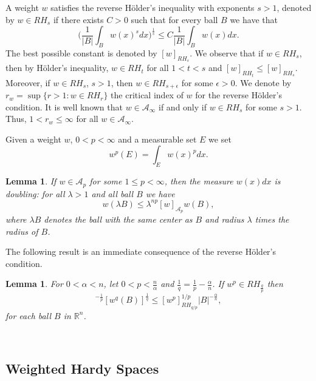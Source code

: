 \documentclass[a4paper,12pt,reqno]{amsart}
\numberwithin{equation}{section}
\newtheorem{lemma}[theorem]{Lemma}
\begin{document}
	A weight $w$ satisfies the reverse H\"{o}lder's inequality with exponents $s>1$, denoted by $w \in RH_s$ if there exists $C>0$ such that for every ball $B$ we have that 
	\begin{equation}\label{cond s}
		\Big( \frac{1}{|B|} \int_B w(x)^{s} dx \Big)^{\frac{1}{s}} \leq C\frac{1}{|B|} \int_B w(x)dx.
	\end{equation}
	The best possible constant is denoted by $[w]_{RH_s}$. We observe that if $w \in RH_s$, then by H\"{o}lder's inequality, $w \in RH_t$ for all $1 < t < s$ and $[w]_{RH_t} \leq [w]_{RH_s}$.
	Moreover, if $w \in RH_s$, $s>1$, then $w \in RH_{s+\epsilon}$ for some $\epsilon >0$. We denote by $r_w=\sup\{r>1 : w \in RH_r\}$ the critical index of $w$ for the reverse H\"{o}lder's condition.
	It is well known that $w \in \mathcal{A}_{\infty}$ if and only if $w \in RH_s$ for some $s>1$. Thus, $1<r_w \leq \infty$ for all $w \in \mathcal{A}_{\infty}$.\newline
	
	Given a weight $w$, $0<p<\infty$ and a measurable set $E$ we set 
	$$w^p(E)=\int_E w(x)^p dx.$$ 
	
	\begin{lemma}
		If $w \in \mathcal{A}_p$ for some $1\leq p< \infty$, then the measure $w(x)dx$ is doubling: for all $\lambda >1$ and all ball $B$ we have
		\begin{equation*}
			w(\lambda B) \leq \lambda^{np} [w]_{\mathcal{A}_p} w(B),
		\end{equation*}
		where $\lambda B$ denotes the ball with the same center as $B$ and radius $\lambda$ times the radius of $B$.
	\end{lemma}
	The following result is an immediate consequence of the reverse H\"{o}lder's condition.
	
	\begin{lemma}\label{weightRH}
		For $0<\alpha<n$, let $0<p<\frac{n}{\alpha}$ and $\frac{1}{q}=\frac{1}{p}-\frac{\alpha}{n}$. If $w^p  \in RH_{\frac{q}{p}}$ then
		\begin{equation}
			[w^p(B)]^{-\frac{1}{p}} [w^q(B)]^{\frac{1}{q}}\leq [w^p]^{1/p}_{RH_{q/p}} |B|^{-\frac{\alpha}{n}},
		\end{equation}
		for each ball $B$ in $\mathbb{R}^n$.
	\end{lemma}
	
	\
	
	
	
	\subsection{Weighted Hardy Spaces}
	
\end{document}
